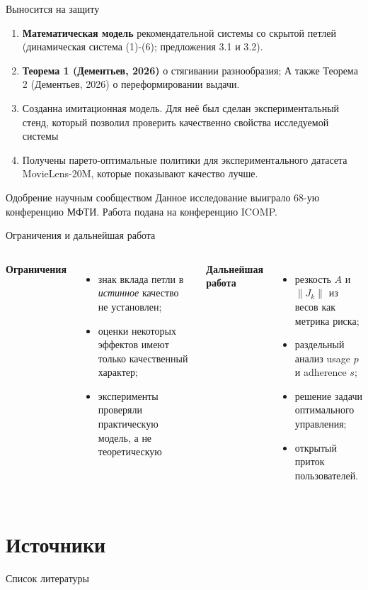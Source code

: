 \documentclass[aspectratio=43]{beamer}
\begin{document}
\begin{frame}{Выносится на защиту}
\footnotesize

\begin{enumerate}\setlength\itemsep{0.6em}
\item \textcolor{myNewColorA}{\textbf{Математическая модель}} рекомендательной системы со скрытой петлей (динамическая система (1)-(6); предложения 3.1 и 3.2).
\item \textcolor{myNewColorA}{\textbf{Теорема 1 (Дементьев, 2026)}} о стягивании разнообразия; А также Теорема 2 (Дементьев, 2026) о переформировании выдачи.
\item \textcolor{myNewColorA}{Созданна имитационная модель}. Для неё был сделан экспериментальный стенд, который позволил проверить качественно свойства исследуемой системы
\item \textcolor{myNewColorA}{Получены парето-оптимальные политики} для экспериментального датасета MovieLens-20M, которые показывают качество лучше.
\end{enumerate}

\vspace{0.7em}
\begin{center}
\textcolor{myNewColorA}{Одобрение научным сообществом} Данное исследование выиграло 68-ую конференцию МФТИ. Работа подана на конференцию ICOMP.
\end{center}
\end{frame}

\begin{frame}{Ограничения и дальнейшая работа}
\scriptsize
\begin{columns}[T]
\textcolor{myNewColorA}{\textbf{Ограничения}}
\begin{itemize}\setlength\itemsep{0.3em}
\item знак вклада петли в \emph{истинное} качество не установлен;
\item оценки некоторых эффектов имеют только качественный характер;
\item эксперименты проверяли практическую модель, а не теоретическую  
\end{itemize}

\textcolor{myNewColorA}{\textbf{Дальнейшая работа}}
\begin{itemize}\setlength\itemsep{0.3em}
\item резкость $A$ и $\lVert J_k\rVert$ из весов как метрика риска;
\item раздельный анализ usage $p$ и adherence $s$;
\item решение задачи оптимального управления;
\item открытый приток пользователей.
\end{itemize}
\end{columns}
\end{frame}

\section{Источники}
\begin{frame}{Список литературы}
\tiny
\nocite{*}


\end{frame}
\end{document}
